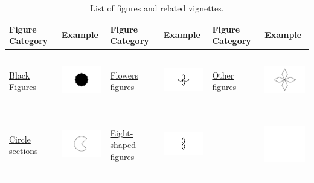 \begin{table}

\caption{\label{tab:figures-list-static}List of figures and related vignettes.}
\centering
\begin{tabular}[t]{>{\raggedright\arraybackslash}p{2cm}|>{\raggedright\arraybackslash}p{2cm}|>{\raggedright\arraybackslash}p{2cm}|>{\raggedright\arraybackslash}p{2cm}|>{\raggedright\arraybackslash}p{2cm}|>{\raggedright\arraybackslash}p{2cm}}
\hline
Figure Category & Example & Figure Category & Example & Figure Category & Example\\
\hline
\href{https://cran.r-project.org/web/packages/matRiks/vignettes/black-figures.html}{Black Figures} & \includegraphics[width=1in, height=1in]{black-figures.png} & \href{https://cran.r-project.org/web/packages/matRiks/vignettes/flowers-figures.html}{Flowers figures} & \includegraphics[width=1in, height=1in]{flowers.png} & \href{https://cran.r-project.org/web/packages/matRiks/vignettes/other-figures.html}{Other figures} & \includegraphics[width=1in, height=1in]{other-figures.png}\\
\hline
\href{https://cran.r-project.org/web/packages/matRiks/vignettes/circle-sections.html}{Circle sections} & \includegraphics[width=1in, height=1in]{circle-sections.png} & \href{https://cran.r-project.org/web/packages/matRiks/vignettes/eight-shapes-figures.html}{Eight-shaped figures} & \includegraphics[width=1in, height=1in]{eight-shapes-figures.png} &  & \includegraphics[width=1in, height=1in]{empty.png}\\

\end{tabular}
\end{table}
